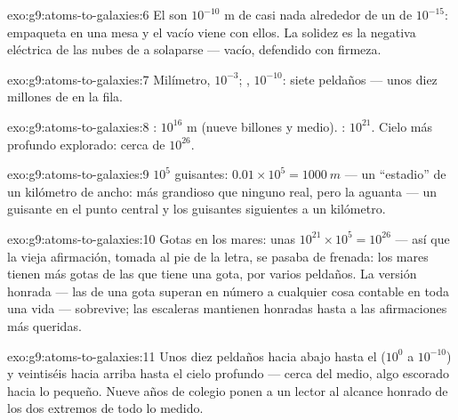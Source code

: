 \begin{solution}{exo:g9:atoms-to-galaxies:6}
El  son $10^{-10}$ \unit{m} de casi nada alrededor de un
 de $10^{-15}$: empaqueta  en una mesa y el
vacío viene con ellos. La solidez es la negativa eléctrica de las nubes
de  a solaparse --- vacío, defendido con firmeza.
\end{solution}

\begin{solution}{exo:g9:atoms-to-galaxies:7}
Milímetro, $10^{-3}$; , $10^{-10}$: siete peldaños --- unos
diez millones de  en la fila.
\end{solution}

\begin{solution}{exo:g9:atoms-to-galaxies:8}
: $10^{16}$ \unit{m} (nueve billones y medio). : $10^{21}$. Cielo más profundo explorado: cerca de
$10^{26}$.
\end{solution}

\begin{solution}{exo:g9:atoms-to-galaxies:9}
$10^{5}$ guisantes: $0.01 \times 10^{5} = \qty{1000}{m}$ --- un
``estadio'' de un kilómetro de ancho: más grandioso que ninguno real,
pero la  aguanta --- un guisante en el punto central y los
guisantes siguientes a un kilómetro.
\end{solution}

\begin{solution}{exo:g9:atoms-to-galaxies:10}
Gotas en los mares: unas $10^{21} \times 10^{5} = 10^{26}$ --- así que
la vieja afirmación, tomada al pie de la letra, se pasaba de frenada:
los mares tienen más gotas de las que tiene  una gota,
por varios peldaños. La versión honrada --- las  de una
gota superan en número a cualquier cosa contable en toda una vida ---
sobrevive; las escaleras mantienen honradas hasta a las afirmaciones
más queridas.
\end{solution}

\begin{solution}{exo:g9:atoms-to-galaxies:11}
Unos diez peldaños hacia abajo hasta el  ($10^{0}$ a
$10^{-10}$) y veintiséis hacia arriba hasta el cielo profundo --- cerca
del medio, algo escorado hacia lo pequeño. Nueve años de colegio ponen
a un lector al alcance honrado de los dos extremos de todo lo medido.
\end{solution}

